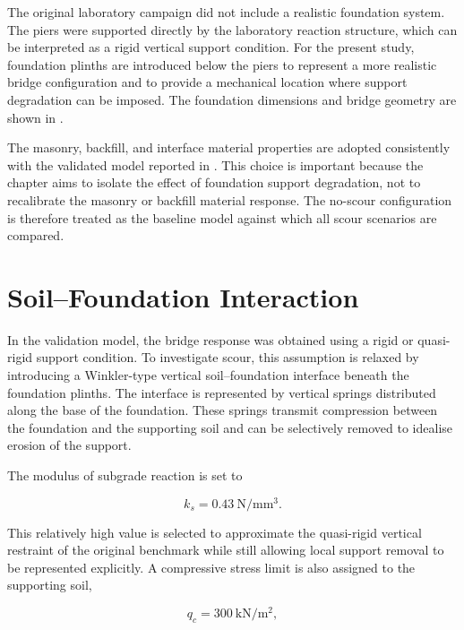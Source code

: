 The original laboratory campaign did not include a realistic foundation system. The piers were supported directly by the laboratory reaction structure, which can be interpreted as a rigid vertical support condition. For the present study, foundation plinths are introduced below the piers to represent a more realistic bridge configuration and to provide a mechanical location where support degradation can be imposed. The foundation dimensions and bridge geometry are shown in .

The masonry, backfill, and interface material properties are adopted consistently with the validated model reported in . This choice is important because the chapter aims to isolate the effect of foundation support degradation, not to recalibrate the masonry or backfill material response. The no-scour configuration is therefore treated as the baseline model against which all scour scenarios are compared.

\section{Soil--Foundation Interaction}
\label{sec:dmem-scour-foundation}

In the validation model, the bridge response was obtained using a rigid or quasi-rigid support condition. To investigate scour, this assumption is relaxed by introducing a Winkler-type vertical soil--foundation interface beneath the foundation plinths. The interface is represented by vertical springs distributed along the base of the foundation. These springs transmit compression between the foundation and the supporting soil and can be selectively removed to idealise erosion of the support.

The modulus of subgrade reaction is set to

\begin{equation}
k_s = 0.43~\mathrm{N/mm^3}.
\label{eq:dmem-scour-ks}
\end{equation}

This relatively high value is selected to approximate the quasi-rigid vertical restraint of the original benchmark while still allowing local support removal to be represented explicitly. A compressive stress limit is also assigned to the supporting soil,

\begin{equation}
q_c = 300~\mathrm{kN/m^2},
\label{eq:dmem-scour-qc}
\end{equation}


